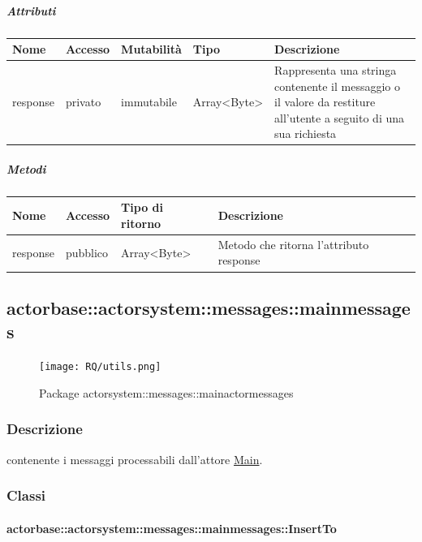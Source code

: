 \documentclass{scalatekids-article}
\begin{document}
\subparagraph{Attributi}
\begin{tabular}{| p{2cm} | p{1.5cm} | p{2cm} | p{3cm} | p{8.5cm} |}
  \hline
  Nome & Accesso & Mutabilità & Tipo & Descrizione\\
  \hline
  response & privato & immutabile & Array<Byte> & Rappresenta una stringa contenente il messaggio o il valore da restiture all'utente a seguito di una sua richiesta\\
  \hline
\end{tabular}

\subparagraph{Metodi}
\begin{tabular}{| l | l | l | l |}
  \hline
  Nome & Accesso & Tipo di ritorno & Descrizione\\
  \hline
  response & pubblico & Array<Byte> & Metodo che ritorna l'attributo response\\
  \hline
\end{tabular}


\subsection{actorbase::actorsystem::messages::mainmessages}
\label{sec:actorbase::actorsystem::messages::mainmessages}

\begin{figure}[H]
  \begin{center}
    \texttt{[image: RQ/utils.png]}
    \caption{Package actorsystem::messages::mainactormessages}
  \end{center}
\end{figure}

\subsubsection{Descrizione}
 contenente i messaggi processabili dall'attore \hyperref[sec:actorbase::actorsystem::actors::main::Main]{Main}.

\subsubsection{Classi}

\paragraph{actorbase::actorsystem::messages::mainmessages::InsertTo}
\label{sec:actorbase::actorsystem::messages::mainmessages::InsertTo}
\end{document}
